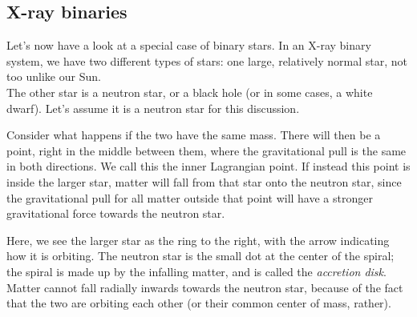 \subsection{X-ray binaries}

Let's now have a look at a special case of binary stars. In an X-ray binary system, we have two different types of stars: one large, relatively normal star, not too unlike our Sun.\\
The other star is a neutron star, or a black hole (or in some cases, a white dwarf). Let's assume it is a neutron star for this discussion.

Consider what happens if the two have the same mass. There will then be a point, right in the middle between them, where the gravitational pull is the same in both directions. We call this the inner Lagrangian point. If instead this point is inside the larger star, matter will fall from that star onto the neutron star, since the gravitational pull for all matter outside that point will have a stronger gravitational force towards the neutron star.

\begin{figure}[H]
  \centering
{}
\end{figure}

Here, we see the larger star as the ring to the right, with the arrow indicating how it is orbiting. The neutron star is the small dot at the center of the spiral; the spiral is made up by the infalling matter, and is called the \emph{accretion disk}. Matter cannot fall radially inwards towards the neutron star, because of the fact that the two are orbiting each other (or their common center of mass, rather).

